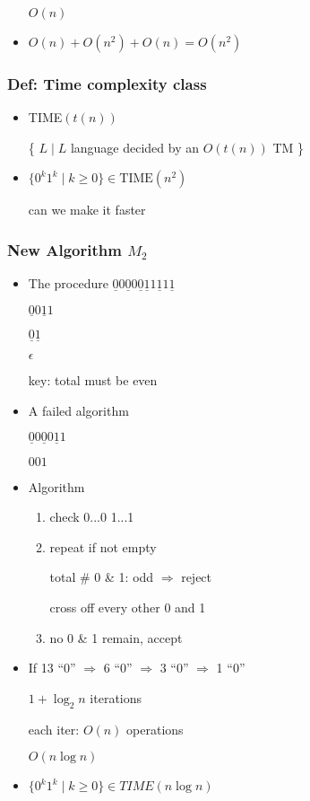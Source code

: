\begin{frame}[allowframebreaks]
\begin{itemize}
$O(n)$
\item $O(n) + O(n^2) +O(n) = O(n^2)$
\end{itemize}\end{frame} \begin{frame}[allowframebreaks] \frametitle{Def: Time complexity class}
  \begin{itemize}
\item TIME$(t(n))$

\{ $L\mid L$ language decided by an $O(t(n))$
TM
\}
\item $\{0^k 1^k \mid k \geq 0\} \in \textrm{TIME}(n^2)$

can we make it faster

\end{itemize}\end{frame} \begin{frame}[allowframebreaks] \frametitle{New Algorithm $M_2$}
  \begin{itemize}
\item The procedure
$\underline{0}0
\underline{0}0
\underline{0}
\underline{1}1
\underline{1}1
\underline{1}
$

$\underline{0}0
\underline{1}1
$

$\underline{0}
\underline{1}
$

$\epsilon$

key: total must be even

\item A failed algorithm


$\underline{0}0
\underline{0}0
\underline{1}1
$

$001
$

\item 
Algorithm
\begin{enumerate}
\item check 0...0 1...1
\item repeat if not empty 

total \# 0 \& 1: odd $\Rightarrow$ reject

cross off every other 0 and 1
\item no 0 \& 1 remain, accept
\end{enumerate}
\item If  13 ``0'' $\Rightarrow$
6 ``0'' $\Rightarrow$
3 ``0'' $\Rightarrow$
1 ``0'' 

$1+\log_2 n$ iterations

each iter: $O(n)$ operations

$O(n \log n)$

\item $\{0^k 1^k\mid k \geq 0\} \in TIME(n \log n)$


\end{itemize}
\end{frame}
